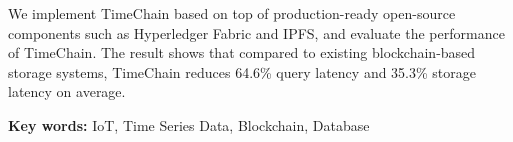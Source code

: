 We implement TimeChain based on top of production-ready open-source components such as Hyperledger Fabric and IPFS, and evaluate the performance of TimeChain. 
The result shows that compared to existing blockchain-based storage systems, TimeChain reduces 64.6\% query latency and 35.3\% storage latency on average.


{\noindent \textbf{Key words:} IoT, Time Series Data, Blockchain, Database}
